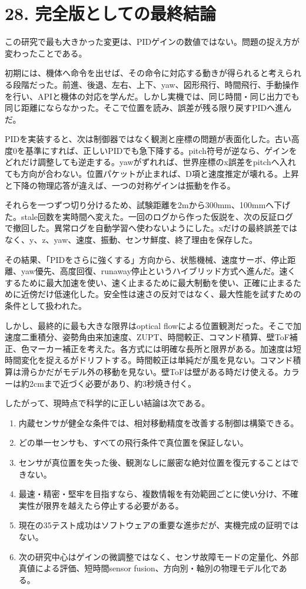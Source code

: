 \documentclass[10pt,a4paper,openany]{ltjsbook}
\begin{document}
\chapter{28. 完全版としての最終結論}
この研究で最も大きかった変更は、PIDゲインの数値ではない。問題の捉え方が変わったことである。\par
初期には、機体へ命令を出せば、その命令に対応する動きが得られると考えられる段階だった。前進、後退、左右、上下、yaw、図形飛行、時間飛行、手動操作を行い、APIと機体の対応を学んだ。しかし実機では、同じ時間・同じ出力でも同じ距離にならなかった。そこで位置を読み、誤差が残る限り戻すPIDへ進んだ。\par
PIDを実装すると、次は制御器ではなく観測と座標の問題が表面化した。古い高度0を基準にすれば、正しいPIDでも急下降する。pitch符号が逆なら、ゲインをどれだけ調整しても逆走する。yawがずれれば、世界座標のx誤差をpitchへ入れても方向が合わない。位置パケットが止まれば、D項と速度推定が壊れる。上昇と下降の物理応答が違えば、一つの対称ゲインは振動を作る。\par
それらを一つずつ切り分けるため、試験距離を2mから300mm、100mmへ下げた。stale回数を実時間へ変えた。一回のログから作った仮説を、次の反証ログで撤回した。異常ログを自動学習へ使わないようにした。xだけの最終誤差ではなく、y、z、yaw、速度、振動、センサ鮮度、終了理由を保存した。\par
その結果、「PIDをさらに強くする」方向から、状態機械、速度サーボ、停止距離、yaw優先、高度回復、runaway停止というハイブリッド方式へ進んだ。速くするために最大加速を使い、速く止まるために最大制動を使い、正確に止まるために近傍だけ低速化した。安全性は速さの反対ではなく、最大性能を試すための条件として扱われた。\par
しかし、最終的に最も大きな限界はoptical flowによる位置観測だった。そこで加速度二重積分、姿勢角由来加速度、ZUPT、時間較正、コマンド積算、壁ToF補正、色マーカー補正を考えた。各方式には明確な長所と限界がある。加速度は短時間変化を捉えるがドリフトする。時間較正は単純だが風を見ない。コマンド積算は滑らかだがモデル外の移動を見ない。壁ToFは壁がある時だけ使える。カラーは約2cmまで近づく必要があり、約3秒焼き付く。\par
したがって、現時点で科学的に正しい結論は次である。\par
\begin{enumerate}
\item 内蔵センサが健全な条件では、相対移動精度を改善する制御は構築できる。
\item どの単一センサも、すべての飛行条件で真位置を保証しない。
\item センサが真位置を失った後、観測なしに厳密な絶対位置を復元することはできない。
\item 最速・精密・堅牢を目指すなら、複数情報を有効範囲ごとに使い分け、不確実性が限界を越えたら停止する必要がある。
\item 現在の35テスト成功はソフトウェアの重要な進歩だが、実機完成の証明ではない。
\item 次の研究中心はゲインの微調整ではなく、センサ故障モードの定量化、外部真値による評価、短時間sensor fusion、方向別・軸別の物理モデル化である。
\end{enumerate}
\end{document}
